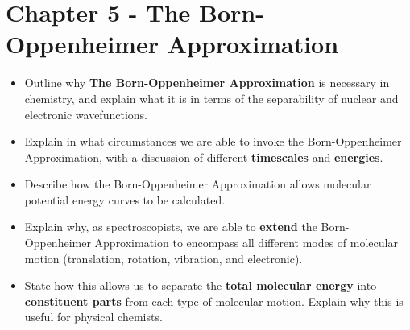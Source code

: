 \documentclass{memoir}[11pt,oneside,a4paper,openany]
\begin{document}
\section*{Chapter 5 - The Born-Oppenheimer Approximation}
\begin{itemize}
	\item Outline why \textbf{The Born-Oppenheimer Approximation} is necessary in chemistry, and explain what it is in terms of the separability of nuclear and electronic wavefunctions.
	\item Explain in what circumstances we are able to invoke the Born-Oppenheimer Approximation, with a discussion of different \textbf{timescales} and \textbf{energies}. 
	\item Describe how the Born-Oppenheimer Approximation allows molecular potential energy curves to be calculated.
	\item Explain why, as spectroscopists, we are able to \textbf{extend} the Born-Oppenheimer Approximation to encompass all different modes of molecular motion (translation, rotation, vibration, and electronic). 
	\item State how this allows us to separate the \textbf{total molecular energy} into \textbf{constituent parts} from each type of molecular motion. Explain why this is useful for physical chemists.
\end{itemize}
\end{document}
